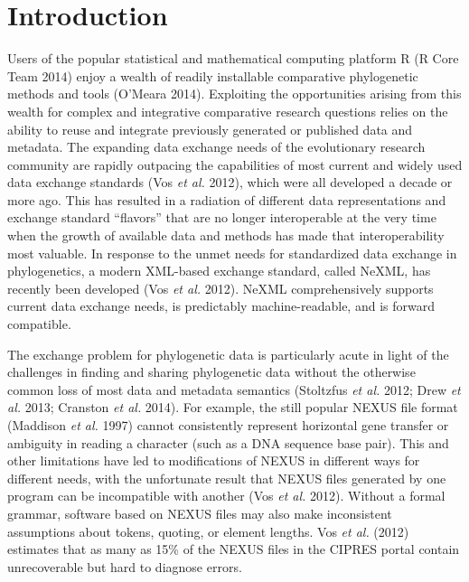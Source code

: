 \documentclass[author-year, review, 11pt]{components/elsarticle} %
\begin{document}
\section{Introduction}\label{introduction}

Users of the popular statistical and mathematical computing platform R
(R Core Team 2014) enjoy a wealth of readily installable comparative
phylogenetic methods and tools (O'Meara 2014). Exploiting the
opportunities arising from this wealth for complex and integrative
comparative research questions relies on the ability to reuse and
integrate previously generated or published data and metadata. The
expanding data exchange needs of the evolutionary research community are
rapidly outpacing the capabilities of most current and widely used data
exchange standards (Vos \emph{et al.} 2012), which were all developed a
decade or more ago. This has resulted in a radiation of different data
representations and exchange standard ``flavors'' that are no longer
interoperable at the very time when the growth of available data and
methods has made that interoperability most valuable. In response to the
unmet needs for standardized data exchange in phylogenetics, a modern
XML-based exchange standard, called NeXML, has recently been developed
(Vos \emph{et al.} 2012). NeXML comprehensively supports current data
exchange needs, is predictably machine-readable, and is forward
compatible.

The exchange problem for phylogenetic data is particularly acute in
light of the challenges in finding and sharing phylogenetic data without
the otherwise common loss of most data and metadata semantics (Stoltzfus
\emph{et al.} 2012; Drew \emph{et al.} 2013; Cranston \emph{et al.}
2014). For example, the still popular NEXUS file format (Maddison
\emph{et al.} 1997) cannot consistently represent horizontal gene
transfer or ambiguity in reading a character (such as a DNA sequence
base pair). This and other limitations have led to modifications of
NEXUS in different ways for different needs, with the unfortunate result
that NEXUS files generated by one program can be incompatible with
another (Vos \emph{et al.} 2012). Without a formal grammar, software
based on NEXUS files may also make inconsistent assumptions about
tokens, quoting, or element lengths. Vos \emph{et al.} (2012) estimates
that as many as 15\% of the NEXUS files in the CIPRES portal contain
unrecoverable but hard to diagnose errors.
\end{document}
